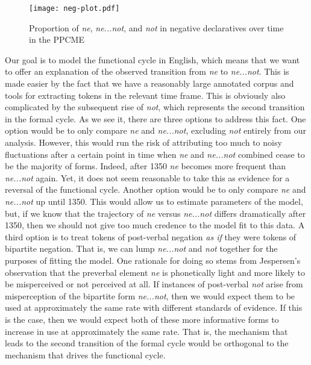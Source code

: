 \documentclass[linguex]{sp}
\theoremstyle{definition} \newtheorem{definition}{Definition}
\begin{document}
\begin{figure}
\centering
     \texttt{[image: neg-plot.pdf]}
\caption{Proportion of \textit{\color{red} ne}, \textit{\color{blue} ne...not}, and \textit{\color{green} not}  in negative declaratives over time in the PPCME}
\label{neg-three-plot}
\end{figure}


Our goal is to model the functional cycle in English, which means that we want to offer an explanation of the observed transition from \textit{\color{red} ne} to \textit{\color{blue} ne...not}. This is made easier by the fact that we have a reasonably large annotated corpus and tools for extracting tokens in the relevant time frame. This is obviously also complicated by the subsequent rise of \textit{\color{green} not}, which represents the second transition in the formal cycle.  As we see it, there are three options to address this fact. One option would be to only compare \textit{\color{red} ne} and \textit{\color{blue} ne...not}, excluding \textit{\color{green} not} entirely from our analysis. However, this would run the risk of attributing too much to noisy fluctuations after a certain point in time when \textit{\color{red} ne} and \textit{\color{blue} ne...not} combined cease to be the majority of forms. Indeed, after 1350 \textit{\color{red} ne} becomes more frequent than \textit{\color{blue} ne...not} again. Yet, it does not seem reasonable to take this as evidence for a reversal of the functional cycle.   Another option would be to only compare \textit{\color{red} ne} and \textit{\color{blue} ne...not} up until 1350. This would allow us to estimate parameters of the model, but, if we know that the trajectory of \textit{\color{red} ne} versus \textit{\color{blue} ne...not} differs dramatically after 1350, then we should not give too much credence to the model fit to this data. A third option is to treat tokens of post-verbal negation \emph{as if} they were tokens of bipartite negation. That is, we can lump \textit{\color{blue} ne...not} and \textit{\color{green} not} together for the purposes of fitting the model. One rationale for doing so stems from Jespersen's \citeyearpar{jespersen:1917} observation that the preverbal element \emph{ne} is phonetically light and more likely to be misperceived or not perceived at all. If instances of post-verbal \textit{\color{green} not}  arise from misperception of the bipartite form \textit{\color{blue} ne...not}, then we would expect them to be used at approximately the same rate with different standards of evidence.  If this is the case, then we would expect both of these more informative forms to increase in use at approximately the same rate.  That is, the mechanism that leads to the second transition of the formal cycle would be orthogonal to the mechanism that drives the functional cycle. 
\end{document}

